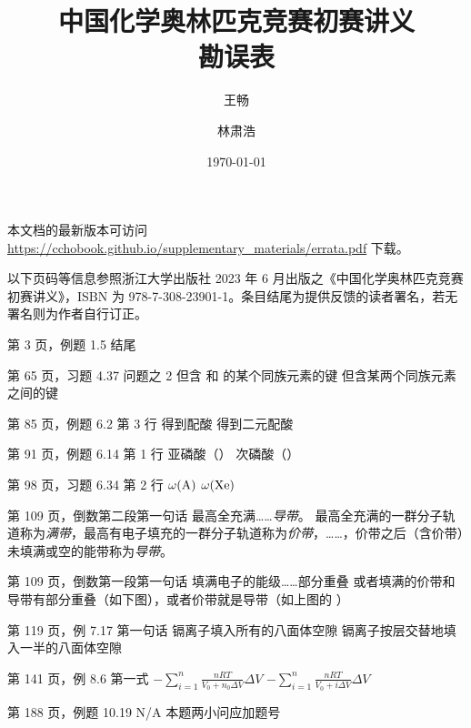 \documentclass{errata}
\title{中国化学奥林匹克竞赛初赛讲义 \\ \bfseries 勘误表}
\author{王畅 \and 林肃浩}
\date{\today}
\begin{document}
    \maketitle
    本文档的最新版本可访问 \url{https://cchobook.github.io/supplementary_materials/errata.pdf} 下载。

    以下页码等信息参照浙江大学出版社 2023 年 6 月出版之《中国化学奥林匹克竞赛初赛讲义》，ISBN 为 978-7-308-23901-1。条目结尾为提供反馈的读者署名，若无署名则为作者自行订正。

    \begin{Errata}
        \item[第 3 页，例题 1.5 结尾]
            \Orig {}
            \Corr {}
        \item[第 65 页，习题 4.37 问题之 2 \cite{otten2009complexation}]
            \Orig 但含  和  的某个同族元素的键
            \Corr 但含某两个同族元素之间的键
        \item[第 85 页，例题 6.2 第 3 行]
            \Orig 得到配酸 
            \Corr 得到二元配酸 
        \item[第 91 页，例题 6.14 第 1 行]
            \Orig 亚磷酸（）
            \Corr 次磷酸（）
        \item[第 98 页，习题 6.34 第 2 行]
            \Orig $\omega(\ce{A})$
            \Corr $\omega(\ce{Xe})$
        \item[第 109 页，倒数第二段第一句话]
            \Orig 最高全充满……\emph{导带}。
            \Corr 最高全充满的一群分子轨道称为\emph{满带}，最高有电子填充的一群分子轨道称为\emph{价带}，……，价带之后（含价带）未填满或空的能带称为\emph{导带}。
        \item[第 109 页，倒数第一段第一句话]
            \Orig 填满电子的能级……部分重叠
            \Corr 或者填满的价带和导带有部分重叠（如下图），或者价带就是导带（如上图的 ）
        \item[第 119 页，例 7.17 第一句话]
            \Orig 镉离子填入所有的八面体空隙
            \Corr 镉离子按层交替地填入一半的八面体空隙
        \item[第 141 页，例 8.6 第一式]
            \Orig $-\sum_{i=1}^n \frac{nRT}{V_0+n_0 \Delta V} \Delta V$
            \Corr $-\sum_{i=1}^n \frac{nRT}{V_0+i \Delta V} \Delta V$
        \item[第 188 页，例题 10.19] \Orig N/A \Corr 本题两小问应加题号

\end{Errata}
\end{document}
